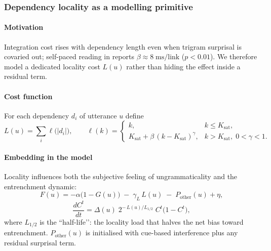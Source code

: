 \documentclass[12pt,letterpaper]{article}
\begin{document}
\subsubsection{Dependency locality as a modelling primitive}\label{sec:dependency-locality}

\paragraph{Motivation}
Integration cost rises with dependency length even when trigram surprisal is covaried out; self-paced reading in \textcite{Bechet2022} reports \(\beta\approx8\;\text{ms/link}\) (\(p<0.01\)).  We therefore model a dedicated locality cost \(L(u)\) rather than hiding the effect inside a residual term.

\paragraph{Cost function}
For each dependency \(d_i\) of utterance \(u\) define
\[
L(u)=\sum_{i}\ell\!\bigl(|d_i|\bigr),\qquad
\ell(k)=
  \begin{cases}
    k, & k\le K_{\text{sat}},\\[4pt]
    K_{\text{sat}}+\beta\,(k-K_{\text{sat}})^{\gamma}, & k>K_{\text{sat}},\;0<\gamma<1.
  \end{cases}
\]

\paragraph{Embedding in the model}
Locality influences both the subjective feeling of ungrammaticality and the entrenchment dynamic:
\[
F(u)= -\alpha\bigl(1-G(u)\bigr)\;-\;\gamma_L\,L(u)\;-\;P_{\text{other}}(u)+\eta,
\]
\[
\frac{dC^{t}}{dt}= \Delta(u)\;2^{-\,L(u)/L_{1/2}}\;C^{t}\bigl(1-C^{t}\bigr),
\]
where \(L_{1/2}\) is the “half-life’’: the locality load that halves the net bias toward entrenchment.  
\(P_{\text{other}}(u)\) is initialised with cue-based interference \autocite{LewisVasishth2005} plus any residual surprisal term.
\end{document}
